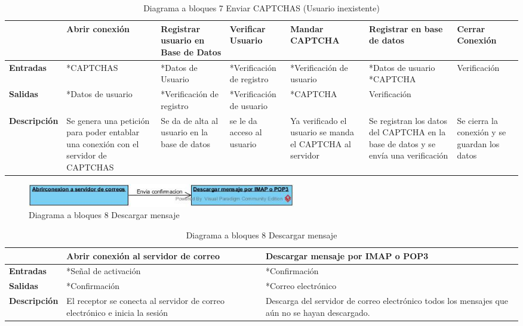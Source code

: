 \begin{table}[H]
 \centering
   {
     \begin{tabular}{| p{2cm} | p{2cm} | p{} | p{2cm} | p{} | p{} | p{2cm} |}
     \hline
     & \textbf{Abrir conexión} & \textbf{Registrar usuario en Base de Datos} & \textbf{Verificar Usuario} & \textbf{Mandar CAPTCHA} & \textbf{Registrar en base de datos} & \textbf{Cerrar Conexión}\\
     \hline
     \textbf{Entradas} & *CAPTCHAS & *Datos de Usuario & *Verificación de registro & *Verificación de usuario & *Datos de usuario *CAPTCHA & Verificación\\
     \hline
     \textbf{Salidas} & *Datos de usuario & *Verificación de registro & *Verificación de usuario & *CAPTCHA & Verificación &\\
     \hline
     \textbf{Descripción} & Se genera una petición para poder entablar una conexión con el servidor de CAPTCHAS & Se da de alta al usuario en la base de datos & se le da acceso  al usuario & Ya verificado el usuario se manda el CAPTCHA al servidor & Se registran los datos del CAPTCHA en la base de datos y se envía una verificación & Se cierra la conexión y se guardan los datos\\

    \end{tabular}
    }
    \caption{Diagrama a bloques 7 Enviar CAPTCHAS (Usuario inexistente)}
    \label{tabla:b7}
\end{table}
\pagebreak
\begin{figure}[H]
	\includegraphics[width=1\linewidth, height=1cm]{./images/bloques8.jpg}
	\caption{Diagrama a bloques 8 Descargar mensaje}
	\label{fig:5-8-1}
\end{figure}
\begin{table}[H]
 \centering
   {
     \begin{tabular}{| p{3cm} | p{4cm} | p{4cm} |}
     \hline
     & \textbf{Abrir conexión al servidor de correo} & \textbf{Descargar mensaje por IMAP o POP3}\\
     \hline
     \textbf{Entradas} & *Señal de activación & *Confirmación\\
     \hline
     \textbf{Salidas} & *Confirmación & *Correo electrónico\\
     \hline
     \textbf{Descripción} & El receptor se conecta al servidor de correo electrónico e inicia la sesión & Descarga del servidor de correo electrónico todos los mensajes que aún no se hayan descargado.\\

    \end{tabular}
    }
    \caption{Diagrama a bloques 8 Descargar mensaje}
    \label{tabla:b8}
\end{table}
